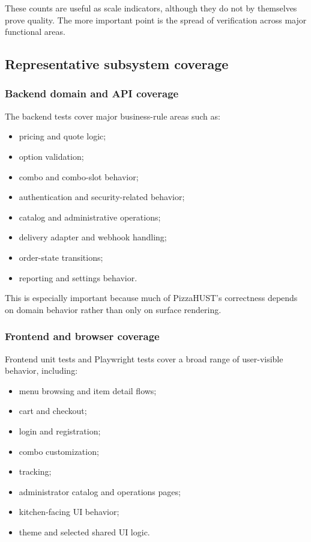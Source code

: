 These counts are useful as scale indicators, although they do not by themselves prove quality. The more important point is the spread of verification across major functional areas.

\subsection{Representative subsystem coverage}

\subsubsection{Backend domain and API coverage}

The backend tests cover major business-rule areas such as:

\begin{itemize}
    \item pricing and quote logic;
    \item option validation;
    \item combo and combo-slot behavior;
    \item authentication and security-related behavior;
    \item catalog and administrative operations;
    \item delivery adapter and webhook handling;
    \item order-state transitions;
    \item reporting and settings behavior.
\end{itemize}

This is especially important because much of PizzaHUST's correctness depends on domain behavior rather than only on surface rendering.

\subsubsection{Frontend and browser coverage}

Frontend unit tests and Playwright tests cover a broad range of user-visible behavior, including:

\begin{itemize}
    \item menu browsing and item detail flows;
    \item cart and checkout;
    \item login and registration;
    \item combo customization;
    \item tracking;
    \item administrator catalog and operations pages;
    \item kitchen-facing UI behavior;
    \item theme and selected shared UI logic.
\end{itemize}

